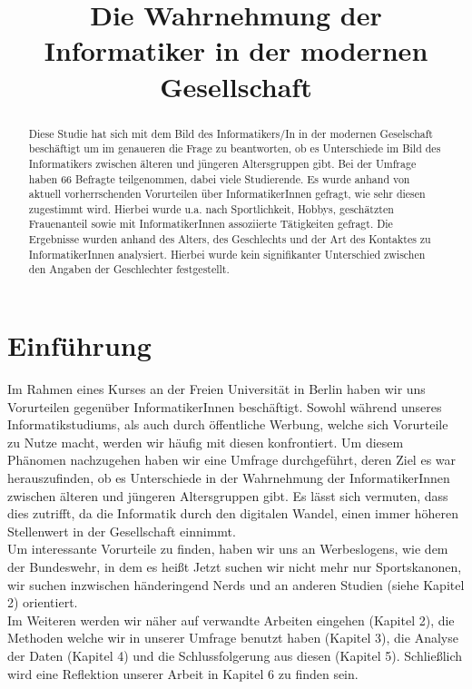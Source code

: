 \documentclass[de]{agse-empir-report}\usepackage[]{graphicx}\usepackage[]{color}
\begin{document}
\title{Die Wahrnehmung der Informatiker in der modernen Gesellschaft}
\author{
    \and
    \and
}

\maketitle


\begin{abstract}
  Diese Studie hat sich mit dem Bild des Informatikers/In in der modernen Geselschaft beschäftigt um im genaueren die Frage zu beantworten, ob es Unterschiede im Bild des Informatikers zwischen älteren und jüngeren Altersgruppen gibt. Bei der Umfrage haben 66 Befragte teilgenommen, dabei viele Studierende. Es wurde anhand von aktuell vorherrschenden Vorurteilen über InformatikerInnen gefragt, wie sehr diesen zugestimmt wird. Hierbei wurde u.a. nach Sportlichkeit, Hobbys, geschätzten Frauenanteil sowie mit InformatikerInnen assoziierte Tätigkeiten gefragt. Die Ergebnisse wurden anhand des Alters, des Geschlechts und der Art des Kontaktes zu InformatikerInnen analysiert. Hierbei wurde kein signifikanter Unterschied zwischen den Angaben der Geschlechter festgestellt.
\end{abstract}


\section[jk]{Einführung}

Im Rahmen eines Kurses an der Freien Universität in Berlin haben wir uns Vorurteilen gegenüber InformatikerInnen beschäftigt. Sowohl während unseres Informatikstudiums, als auch durch öffentliche Werbung, welche sich Vorurteile zu Nutze macht, werden wir häufig mit diesen konfrontiert.
Um diesem Phänomen nachzugehen haben wir eine Umfrage durchgeführt, deren Ziel es war herauszufinden, ob es Unterschiede in der Wahrnehmung der InformatikerInnen zwischen älteren und jüngeren Altersgruppen gibt. Es lässt sich vermuten, dass dies zutrifft, da die Informatik durch den digitalen Wandel, einen immer höheren Stellenwert in der Gesellschaft einnimmt.\\
Um interessante Vorurteile zu finden, haben wir uns an Werbeslogens, wie dem der Bundeswehr, in dem es heißt \glqq Jetzt suchen wir nicht mehr nur Sportskanonen, wir suchen inzwischen händeringend Nerds \grqq \cite{Bundeswehr} und an anderen Studien (siehe Kapitel 2) orientiert. \\
Im Weiteren werden wir näher auf verwandte Arbeiten eingehen (Kapitel 2), die Methoden welche wir in unserer Umfrage benutzt haben (Kapitel 3), die Analyse der Daten (Kapitel 4) und die Schlussfolgerung aus diesen (Kapitel 5). Schließlich wird eine Reflektion unserer Arbeit in Kapitel 6 zu finden sein.
\end{document}
